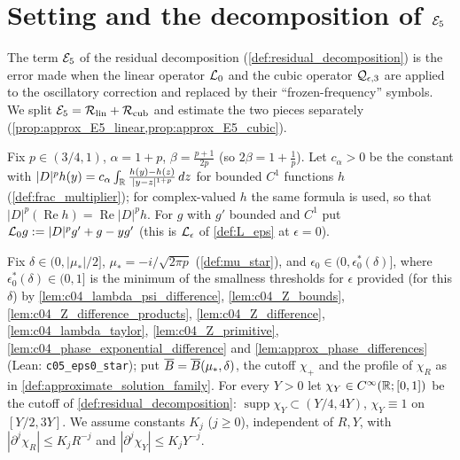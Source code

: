 
\section{Setting and the decomposition of \texorpdfstring{$\mathcal{E}_5$}{E5}}

The term $\mathcal{E}_5$ of the residual decomposition (\cref{def:residual_decomposition}) is the
error made when the linear operator $\mathcal{L}_0$ and the cubic operator $\mathcal{Q}_{\epsilon,3}$
are applied to the oscillatory correction and replaced by their ``frozen-frequency''
symbols. We split $\mathcal{E}_5=\mathcal{R}_{\textup{lin}}+\mathcal{R}_{\textup{cub}}$ and estimate the two
pieces separately (\cref{prop:approx_E5_linear,prop:approx_E5_cubic}).

\begin{definition}
  \label{def:c05_standing}
  Fix $p\in(3/4,1)$, $\alpha=1+p$, $\beta=\frac{p+1}{2p}$ (so $2\beta=1+\frac1p$). Let $c_\alpha>0$ be the
  constant with $|D|^ph(y)=c_\alpha\int_{\mathbb{R}}\frac{h(y)-h(z)}{|y-z|^{1+p}}\,dz$ for bounded $C^1$
  functions $h$ (\cref{def:frac_multiplier}); for complex-valued $h$ the same formula is used, so that
  $|D|^p(\operatorname{Re}h)=\operatorname{Re}|D|^ph$. For $g$ with $g'$ bounded and $C^1$ put
  $\mathcal{L}_0g:=|D|^pg'+g-yg'$ (this is $\mathcal{L}_\epsilon$ of \cref{def:L_eps} at $\epsilon=0$).

  Fix $\delta\in(0,|\mu_*|/2]$, $\mu_*=-i/\sqrt{2\pi p}$ (\cref{def:mu_star}), and
  $\epsilon_0\in(0,\epsilon_0^*(\delta)]$, where $\epsilon_0^*(\delta)\in(0,1]$ is the minimum of the
  smallness thresholds for $\epsilon$ provided (for this $\delta$) by \cref{lem:c04_lambda_psi_difference},
  \cref{lem:c04_Z_bounds}, \cref{lem:c04_Z_difference_products}, \cref{lem:c04_Z_difference},
  \cref{lem:c04_lambda_taylor}, \cref{lem:c04_Z_primitive}, \cref{lem:c04_phase_exponential_difference}
  and \cref{lem:approx_phase_differences} (Lean: \texttt{c05\_eps0\_star}); put
  $\overline{B}=\overline{B}(\mu_*,\delta)$, the cutoff $\chi_+$ and the profile of $\chi_R$ as in
  \cref{def:approximate_solution_family}. For every $Y>0$ let $\chi_Y\in C^\infty(\mathbb{R};[0,1])$ be the cutoff
  of \cref{def:residual_decomposition}: $\operatorname{supp}\chi_Y\subset(Y/4,4Y)$, $\chi_Y\equiv1$ on
  $[Y/2,3Y]$. We assume constants $K_j$ ($j\ge0$), independent of $R,Y$, with
  $|\partial^j\chi_R|\le K_jR^{-j}$ and $|\partial^j\chi_Y|\le K_jY^{-j}$.


\end{definition}
